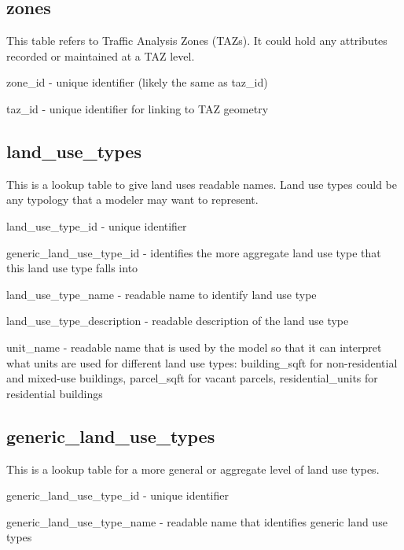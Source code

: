 \subsection{zones} 

This table refers to Traffic Analysis Zones (TAZs). It could hold any attributes recorded or maintained at a TAZ level.

\begin{description}
\item zone\_id - unique identifier (likely the same as taz\_id)
\item taz\_id - unique identifier for linking to TAZ geometry 
\end{description}


\subsection{land\_use\_types} 

This is a lookup table to give land uses readable names. Land use types could be any typology that a modeler may want to represent.

\begin{description}
\item land\_use\_type\_id - unique identifier
\item generic\_land\_use\_type\_id - identifies the more aggregate land use type that this land use type falls into
\item land\_use\_type\_name - readable name to identify land use type
\item land\_use\_type\_description - readable description of the land use type
\item unit\_name - readable name that is used by the model so that it can interpret what units are used for different land use types: building\_sqft for non-residential and mixed-use buildings, parcel\_sqft for vacant parcels, residential\_units for residential buildings 
\end{description}

\subsection{generic\_land\_use\_types} 

This is a lookup table for a more general or aggregate level of land use types.

\begin{description}
\item generic\_land\_use\_type\_id - unique identifier
\item generic\_land\_use\_type\_name - readable name that identifies generic land use types
\end{description}

